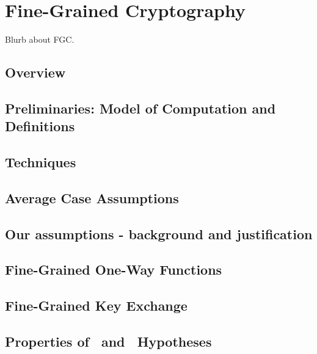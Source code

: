 
\chapter{Fine-Grained Cryptography}
Blurb about FGC.

\section{Overview}


\section{Preliminaries: Model of Computation and Definitions}\label{sec:prelims}


\section{Techniques}

\section{Average Case Assumptions}\label{sec:averageCaseAssumptions}


\section{Our assumptions - background and justification}\label{sec:justifyAssumptions}


\section{Fine-Grained One-Way Functions}\label{sec:fg-owfs}


\section{Fine-Grained Key Exchange}\label{sec:FineGrainedKeyExchange}



\section{Properties of \kSum~and \zkclique~Hypotheses}\label{sec:kcliqueksumAllTHeThings}







